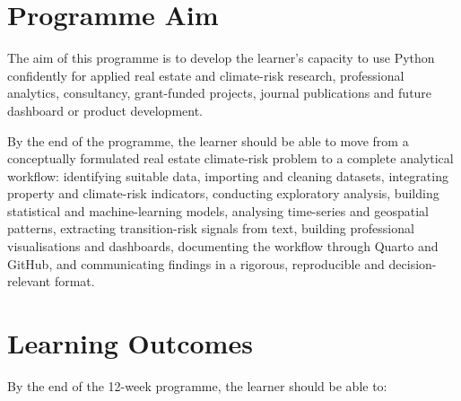 \documentclass[
  a4paper,
]{article}
\begin{document}
\section{Programme Aim}\label{programme-aim}

The aim of this programme is to develop the learner's capacity to use
Python confidently for applied real estate and climate-risk research,
professional analytics, consultancy, grant-funded projects, journal
publications and future dashboard or product development.

By the end of the programme, the learner should be able to move from a
conceptually formulated real estate climate-risk problem to a complete
analytical workflow: identifying suitable data, importing and cleaning
datasets, integrating property and climate-risk indicators, conducting
exploratory analysis, building statistical and machine-learning models,
analysing time-series and geospatial patterns, extracting
transition-risk signals from text, building professional visualisations
and dashboards, documenting the workflow through Quarto and GitHub, and
communicating findings in a rigorous, reproducible and decision-relevant
format.

\section{Learning Outcomes}\label{learning-outcomes}

By the end of the 12-week programme, the learner should be able to:
\end{document}
